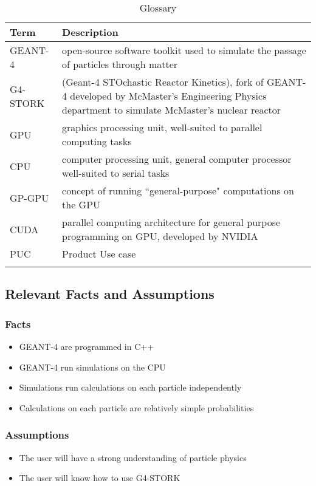 \documentclass[12pt]{article}
\begin{document}
\begin{table}[h]
\centering
\caption{Glossary}
\begin{tabularx}{\textwidth}{l|X}
\Xhline{2\arrayrulewidth}
\bf Term & \bf Description\\
\hline
GEANT-4 & open-source software toolkit used to simulate the passage of particles through matter\\\hline
G4-STORK & (Geant-4 STOchastic Reactor Kinetics), fork of GEANT-4 developed by McMaster's Engineering Physics department to simulate McMaster's nuclear reactor\\\hline
GPU & graphics processing unit, well-suited to parallel computing tasks\\\hline
CPU & computer processing unit, general computer processor well-suited to serial tasks\\\hline
GP-GPU & concept of running ``general-purpose" computations on the GPU\\\hline
CUDA & parallel computing architecture for general purpose programming on GPU, developed by NVIDIA\\\hline
PUC & Product Use case\\
\Xhline{2\arrayrulewidth}
\end{tabularx}
\end{table}

\subsection{Relevant Facts and Assumptions} %
\subsubsection{Facts}
\begin{itemize}
\item GEANT-4 are programmed in C++
\item GEANT-4 run simulations on the CPU
\item Simulations run calculations on each particle independently
\item Calculations on each particle are relatively simple probabilities
\end{itemize}

\subsubsection{Assumptions}
\begin{itemize}
\item The user will have a strong understanding of particle physics
\item The user will know how to use G4-STORK
\end{itemize}
\end{document}
